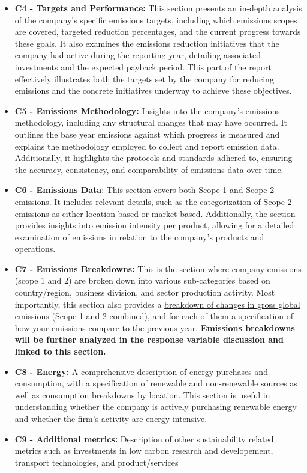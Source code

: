 \begin{itemize}
    \item \textbf{C4 - Targets and Performance:} This section presents an in-depth analysis of the company's specific emissions targets, including which emissions scopes are covered, targeted reduction percentages, and the current progress towards these goals. It also examines the emissions reduction initiatives that the company had active during the reporting year, detailing associated investments and the expected payback period. This part of the report effectively illustrates both the targets set by the company for reducing emissions and the concrete initiatives underway to achieve these objectives.
    \item \textbf{C5 - Emissions Methodology:} Insights into the company's emissions methodology, including any structural changes that may have occurred. It outlines the base year emissions against which progress is measured and explains the methodology employed to collect and report emission data. Additionally, it highlights the protocols and standards adhered to, ensuring the accuracy, consistency, and comparability of emissions data over time.
    \item \textbf{C6 - Emissions Data}: This section covers both Scope 1 and Scope 2 emissions. It includes relevant details, such as the categorization of Scope 2 emissions as either location-based or market-based. Additionally, the section provides insights into emission intensity per product, allowing for a detailed examination of emissions in relation to the company's products and operations. 
    \item \textbf{C7 - Emissions Breakdowns:} This is the section where company emissions (scope 1 and 2) are broken down into various sub-categories based on country/region, business division, and sector production activity. Most importantly, this section also provides a \underline{breakdown of changes in gross global emissions} (Scope 1 and 2 combined), and for each of them a specification of how your emissions compare to the previous year. \textbf{Emissions breakdowns will be further analyzed in the response variable discussion and linked to this section.}
    \item \textbf{C8 - Energy:} A comprehensive description of energy purchases and consumption, with a specification of renewable and non-renewable sources as well as consumption breakdowns by location. This section is useful in understanding whether the company is actively purchasing renewable energy and whether the firm's activity are energy intensive. 
    \item \textbf{C9 - Additional metrics:} Description of other sustainability related metrics such as investments in low carbon research and developement, transport technologies, and product/services

\end{itemize}
